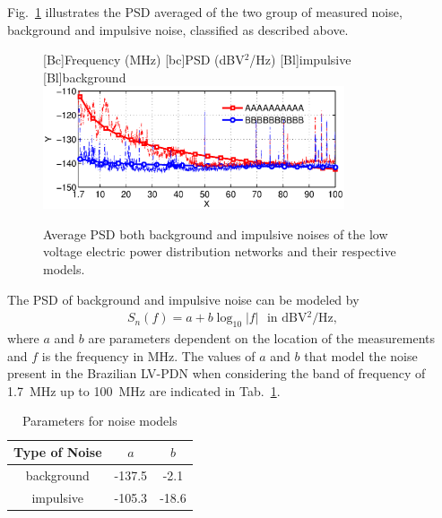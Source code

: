 \documentclass[journal]{IEEEtran}
\newcommand{\tamfig}{3.5in}    %
\begin{document}
	Fig.~\ref{Fig:PSDRuidoFundoImp} illustrates the PSD averaged of the two group of measured noise, background and impulsive noise, classified as described above. 
	\begin{figure}[!htp]
		\begin{centering}
			[Bc]{Frequency (MHz)}    
			[bc]{PSD (dBV$^2$/Hz)}
			[Bl]{impulsive}
			[Bl]{background}
			\includegraphics[width=\tamfig]{Figuras/PSDRuidoFundoImp.eps}
			\caption{Average PSD both background and impulsive noises of the low voltage electric power distribution networks and their respective models.}
			\label{Fig:PSDRuidoFundoImp}
		\end{centering}
	\end{figure}
	
	The PSD of background and impulsive noise can be modeled by
	\begin{eqnarray}\label{eq-psdOutdoor}
	S_n(f) = a + b\log_{10}|f| \ \ \ \mbox{in dBV$^2$/Hz},  
	\end{eqnarray}
	where $a$ and $b$ are parameters dependent on the location of the measurements and $f$ is the frequency in MHz. The values of $a$ and $b$ that model the noise present in the Brazilian \ac{LV-PDN} when considering the band of frequency of 1.7~MHz up to 100~MHz are indicated in Tab.~\ref{Tab:ParamNoise}. 
	\begin{table}[!htb]
		\centering
		\caption{Parameters for noise models}
		\footnotesize 
		\begin{tabular}{c|c|c}
			\hline 
			Type of Noise    & $a$ & $b$\\ 
			\hline 
			background & -137.5 & -2.1  \\
			\hline
			impulsive & -105.3 & -18.6  \\
			\hline
		\end{tabular} \label{Tab:ParamNoise}
	\end{table}
	
\end{document}
